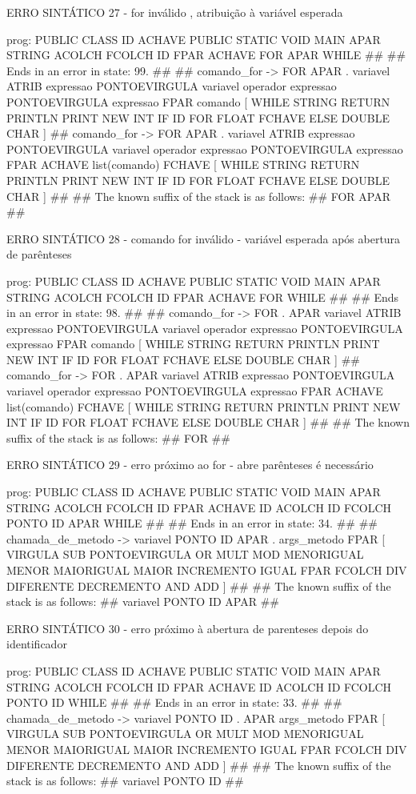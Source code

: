 \documentclass[12pt,a4paper,twoside]{report}
\begin{document}
\begin{terminal}
ERRO SINTÁTICO 27 -  for inválido , atribuição à variável esperada

prog: PUBLIC CLASS ID ACHAVE PUBLIC STATIC VOID MAIN APAR STRING ACOLCH FCOLCH ID FPAR ACHAVE FOR APAR WHILE 
##
## Ends in an error in state: 99.
##
## comando_for -> FOR APAR . variavel ATRIB expressao PONTOEVIRGULA variavel operador expressao PONTOEVIRGULA expressao FPAR comando [ WHILE STRING RETURN PRINTLN PRINT NEW INT IF ID FOR FLOAT FCHAVE ELSE DOUBLE CHAR ]
## comando_for -> FOR APAR . variavel ATRIB expressao PONTOEVIRGULA variavel operador expressao PONTOEVIRGULA expressao FPAR ACHAVE list(comando) FCHAVE [ WHILE STRING RETURN PRINTLN PRINT NEW INT IF ID FOR FLOAT FCHAVE ELSE DOUBLE CHAR ]
##
## The known suffix of the stack is as follows:
## FOR APAR 
##

ERRO SINTÁTICO 28 -  comando for  inválido - variável esperada após abertura de parênteses

prog: PUBLIC CLASS ID ACHAVE PUBLIC STATIC VOID MAIN APAR STRING ACOLCH FCOLCH ID FPAR ACHAVE FOR WHILE 
##
## Ends in an error in state: 98.
##
## comando_for -> FOR . APAR variavel ATRIB expressao PONTOEVIRGULA variavel operador expressao PONTOEVIRGULA expressao FPAR comando [ WHILE STRING RETURN PRINTLN PRINT NEW INT IF ID FOR FLOAT FCHAVE ELSE DOUBLE CHAR ]
## comando_for -> FOR . APAR variavel ATRIB expressao PONTOEVIRGULA variavel operador expressao PONTOEVIRGULA expressao FPAR ACHAVE list(comando) FCHAVE [ WHILE STRING RETURN PRINTLN PRINT NEW INT IF ID FOR FLOAT FCHAVE ELSE DOUBLE CHAR ]
##
## The known suffix of the stack is as follows:
## FOR 
##

ERRO SINTÁTICO 29 -  erro próximo ao for - abre parênteses é necessário

prog: PUBLIC CLASS ID ACHAVE PUBLIC STATIC VOID MAIN APAR STRING ACOLCH FCOLCH ID FPAR ACHAVE ID ACOLCH ID FCOLCH PONTO ID APAR WHILE 
##
## Ends in an error in state: 34.
##
## chamada_de_metodo -> variavel PONTO ID APAR . args_metodo FPAR [ VIRGULA SUB PONTOEVIRGULA OR MULT MOD MENORIGUAL MENOR MAIORIGUAL MAIOR INCREMENTO IGUAL FPAR FCOLCH DIV DIFERENTE DECREMENTO AND ADD ]
##
## The known suffix of the stack is as follows:
## variavel PONTO ID APAR 
##

ERRO SINTÁTICO 30 -  erro próximo à abertura de parenteses depois do identificador

prog: PUBLIC CLASS ID ACHAVE PUBLIC STATIC VOID MAIN APAR STRING ACOLCH FCOLCH ID FPAR ACHAVE ID ACOLCH ID FCOLCH PONTO ID WHILE 
##
## Ends in an error in state: 33.
##
## chamada_de_metodo -> variavel PONTO ID . APAR args_metodo FPAR [ VIRGULA SUB PONTOEVIRGULA OR MULT MOD MENORIGUAL MENOR MAIORIGUAL MAIOR INCREMENTO IGUAL FPAR FCOLCH DIV DIFERENTE DECREMENTO AND ADD ]
##
## The known suffix of the stack is as follows:
## variavel PONTO ID 
##


\end{terminal}
\end{document}
